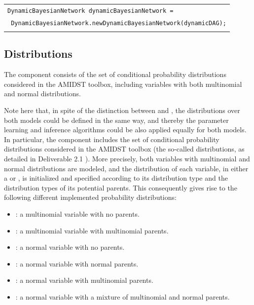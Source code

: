 \begin{table}[H]
\begin{tabular}{l} \\ \hline

        \texttt{DynamicBayesianNetwork dynamicBayesianNetwork = }\\ \texttt{ DynamicBayesianNetwork.newDynamicBayesianNetwork(dynamicDAG);}\\\\ \hline 
\end{tabular}
\end{table}


\subsection{Distributions}

The  component consists of the set of conditional probability distributions considered in the AMIDST toolbox, including variables with both multinomial and normal distributions. 

Note here that, in spite of the distinction between  and , the distributions over both models could be defined in the same way, and thereby the parameter learning and inference algorithms could be also applied equally for both models. In particular, the  component includes the set of conditional probability distributions considered in the AMIDST toolbox (the so-called  distributions, as detailed in Deliverable 2.1 \cite{Deliverable2.1}). More precisely, both variables with multinomial and normal distributions are modeled, and the distribution of each variable, in either a  or , is initialized and specified according to its distribution type and the distribution types of its potential parents. This consequently gives rise to the following different implemented probability distributions:

\begin{itemize}
  \item {}: a multinomial variable with no parents.
  \item {}: a multinomial variable with multinomial parents.
  \item {}: a normal variable with no parents.
  \item {}: a normal variable with normal parents.
  \item {}: a normal variable with multinomial parents.
  \item {}: a normal variable with a mixture of multinomial and normal parents.
\end{itemize}

